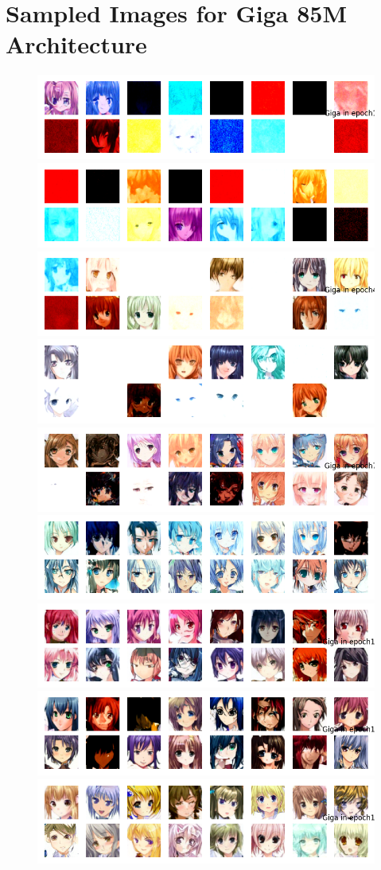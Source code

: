 \documentclass[twocolumn,superscriptaddress,aps]{revtex4-1}
\begin{document}
\section{Sampled Images for Giga 85M Architecture}
\begin{figure}[H]
    \centering
    \includegraphics[width=.32\textwidth]{figures/85M_params_GIGA_DDPM_Unet_ckpt_epoch_1_epoch_1_samples.png}
    \includegraphics[width=.32\textwidth]{figures/85M_params_GIGA_DDPM_Unet_ckpt_epoch_3_with_16_samples.png}
    \includegraphics[width=.32\textwidth]{figures/85M_params_GIGA_DDPM_Unet_ckpt_epoch_4_epoch_4_samples.png}
    \includegraphics[width=.32\textwidth]{figures/85M_params_GIGA_DDPM_Unet_ckpt_epoch_5_with_16_samples.png}
    \includegraphics[width=.32\textwidth]{figures/85M_params_GIGA_DDPM_Unet_ckpt_epoch_7_epoch_7_samples.png}
    \includegraphics[width=.32\textwidth]{figures/85M_params_GIGA_DDPM_Unet_ckpt_epoch_9.png}
    \includegraphics[width=.32\textwidth]{figures/giga_unet_ddpm_85M_ckpt_epoch_10_epoch_10_samples.png}
    \includegraphics[width=.32\textwidth]{figures/giga_unet_ddpm_85M_ckpt_epoch_13_epoch_13_samples.png}
    \includegraphics[width=.32\textwidth]{figures/giga_unet_ddpm_85M_ckpt_epoch_16_epoch_16_samples.png}

\end{figure}
\end{document}
